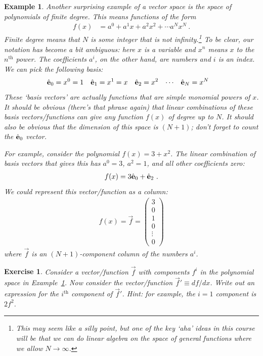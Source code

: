 \documentclass[12pt]{article}
\newtheorem{exercise}{Exercise}[section]
\newtheorem{example}{Example}[section]
\begin{document}
\begin{example}\label{eg:polynomial:space}
Another surprising example of a vector space is the space of polynomials of finite degree. This means functions of the form
\begin{align}
    f(x) &= a^0 + a^1 x + a^2x^2 + \cdots a^N x^N \ .
\end{align}
Finite degree means that $N$ is some integer that is not infinity.\footnote{This may seem like a silly point, but one of the key `aha' ideas in this course will be that we can do linear algebra on the space of general functions where we allow $N\to \infty$.}
To be clear, our notation has become a bit ambiguous: here $x$ is a variable and $x^n$ means $x$ to the $n^\text{th}$ power. The coefficients $a^i$, on the other hand, are numbers and $i$ is an index. We can pick the following basis:
\begin{align}
    {\hat{\mathbf{e}}}_0 &= x^0 = 1 &
    {\hat{\mathbf{e}}}_1 &= x^1 = x &
    {\hat{\mathbf{e}}}_2 &= x^2 &
    \cdots&&
    {\hat{\mathbf{e}}}_N &= x^N &
\end{align}
These `basis vectors' are actually functions that are simple monomial powers of $x$. It should be obvious (there's that phrase again) that linear combinations of these basis vectors/functions can give any function $f(x)$ of degree up to $N$. It should also be obvious that the dimension of this space is $(N+1)$; don't forget to count the ${\hat{\mathbf{e}}}_0$ vector.

For example, consider the polynomial $f(x) = 3+x^2$. The linear combination of basis vectors that gives this has $a^0 = 3$, $a^2 = 1$, and all other coefficients zero:
\begin{align}
    f(x) = 3{\hat{\mathbf{e}}}_0 + {\hat{\mathbf{e}}}_2 \ .
\end{align}
We could represent this vector/function as a column:
\begin{align}
    f(x) = \vec{f} = 
    \begin{pmatrix}
        3 \\
        0 \\
        1 \\
        0 \\
        \vdots  \\
        0
    \end{pmatrix}
\end{align}
where $\vec{f}$ is an $(N+1)$-component column of the numbers $a^i$.
\end{example}

\begin{exercise}
Consider a vector/function $\vec{f}$ with components $f^i$ in the polynomial space in Example~\ref{eg:polynomial:space}. Now consider the vector/function $\vec{f}' \equiv df/dx$. Write out an expression for the $i^\text{th}$ component of $\vec{f}'$. \emph{Hint}: for example, the $i=1$ component is $2f^2$.
\end{exercise}
\end{document}
